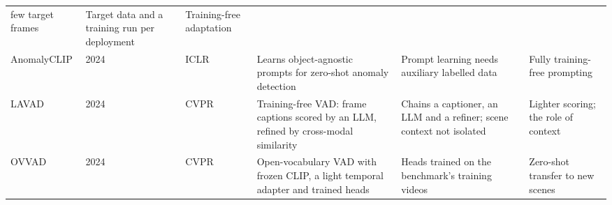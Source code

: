 \documentclass[a4paper,fleqn]{cas-sc}
\begin{document}
\begin{table}[width=\linewidth,cols=6,pos=htbp]
\begin{tabularx}{\linewidth}{@{}W{2.1cm} l W{1.2cm} Z Z Z@{}}
few target frames &
Target data and a training run per deployment &
Training-free adaptation \\
\addlinespace
AnomalyCLIP \citep{zhou2024anomalyclip} & 2024 & ICLR &
Learns object-agnostic prompts for zero-shot anomaly detection &
Prompt learning needs auxiliary labelled data &
Fully training-free prompting \\
\addlinespace
LAVAD \citep{zanella2024lavad} & 2024 & CVPR &
Training-free VAD: frame captions scored by an LLM, refined by cross-modal
similarity &
Chains a captioner, an LLM and a refiner; scene context not isolated &
Lighter scoring; the role of context \\
\addlinespace
OVVAD \citep{wu2024ovvad} & 2024 & CVPR &
Open-vocabulary VAD with frozen CLIP, a light temporal adapter and trained heads &
Heads trained on the benchmark's training videos &
Zero-shot transfer to new scenes \\
\bottomrule
\end{tabularx}
\end{table}
\end{document}
